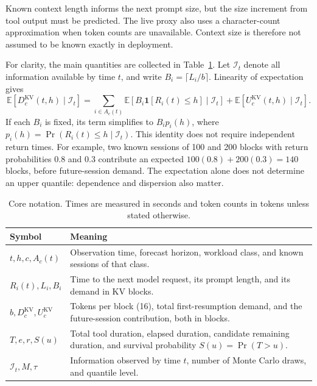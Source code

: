 \documentclass[11pt,a4paper]{article}
\begin{document}
Known context length informs the next prompt size, but the size increment from tool output must be predicted. The live proxy also uses a character-count approximation when token counts are unavailable. Context size is therefore not assumed to be known exactly in deployment.

For clarity, the main quantities are collected in Table~\ref{tab:notation}. Let \(\mathcal{I}_t\) denote all information available by time \(t\), and write \(B_i=\lceil L_i/b\rceil\). Linearity of expectation gives
\begin{equation}
\mathbb{E}[D^{\mathrm{KV}}_c(t,h)\mid\mathcal{I}_t]
=\sum_{i\in A_c(t)}\mathbb{E}[B_i\mathbf{1}[R_i(t)\le h]\mid\mathcal{I}_t]
+\mathbb{E}[U^{\mathrm{KV}}_c(t,h)\mid\mathcal{I}_t].
\label{eq:expected-demand}
\end{equation}
If each \(B_i\) is fixed, its term simplifies to \(B_i p_i(h)\), where \(p_i(h)=\Pr(R_i(t)\le h\mid\mathcal{I}_t)\). This identity does not require independent return times. For example, two known sessions of 100 and 200 blocks with return probabilities 0.8 and 0.3 contribute an expected \(100(0.8)+200(0.3)=140\) blocks, before future-session demand. The expectation alone does not determine an upper quantile: dependence and dispersion also matter.

\begin{table}[!htbp]
\centering\small
\caption{Core notation. Times are measured in seconds and token counts in tokens unless stated otherwise.}
\label{tab:notation}
\begin{tabularx}{\linewidth}{@{}p{.25\linewidth}X@{}}
\toprule
Symbol & Meaning \\\midrule
\(t,h,c,A_c(t)\) & Observation time, forecast horizon, workload class, and known sessions of that class. \\
\(R_i(t),L_i,B_i\) & Time to the next model request, its prompt length, and its demand in KV blocks. \\
\(b,D_c^{\mathrm{KV}},U_c^{\mathrm{KV}}\) & Tokens per block (16), total first-resumption demand, and the future-session contribution, both in blocks. \\
\(T,e,r,S(u)\) & Total tool duration, elapsed duration, candidate remaining duration, and survival probability \(S(u)=\Pr(T>u)\). \\
\(\mathcal I_t,M,\tau\) & Information observed by time \(t\), number of Monte Carlo draws, and quantile level. \\
\bottomrule
\end{tabularx}
\end{table}
\end{document}
